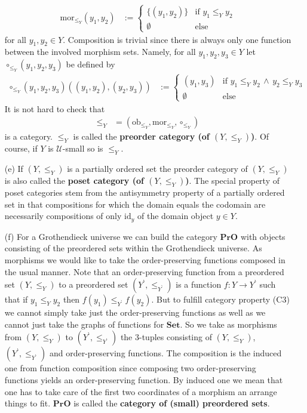\begin{exa}
\begin{enumerate}
\begin{align*}
  \mathrm{mor}_{\pmb{\leq}_{Y}}(y_{1},y_{2})
  &:=
  \begin{cases}
    \lbrace (y_{1},y_{2}) \rbrace
    &
    \text{if }
    y_{1}
    \leq_{Y}
    y_{2}
    \\
    \emptyset
    &
    \text{else}
  \end{cases}
\end{align*}
for all $y_{1},y_{2} \in Y$. Composition is trivial since there is always only one function between the involved morphism sets. Namely, for all $y_{1},y_{2},y_{3} \in Y$ let $\circ_{\pmb{\leq}_{Y}}(y_{1},y_{2},y_{3})$ be defined by
\begin{align*}
  \circ_{\pmb{\leq}_{Y}}(y_{1},y_{2},y_{3})
  \left(
    (y_{1},y_{2}),
    (y_{2},y_{3})
  \right)
  &:=
  \begin{cases}
    (y_{1},y_{3})
    &
    \text{if }
    y_{1}
    \leq_{Y}
    y_{2}
    \,
    \land
    \,
    y_{2}
    \leq_{Y}
    y_{3}
    \\
    \emptyset
    &
    \text{else}
  \end{cases}
\end{align*}
It is not hard to check that
\begin{align*}
  \pmb{\leq}_{Y}
  &=
  \left(
    \mathrm{ob}_{\pmb{\leq}_{Y}},
    \mathrm{mor}_{\pmb{\leq}_{Y}},
    \circ_{\pmb{\leq}_{Y}}
  \right)
\end{align*}
is a category. $\pmb{\leq}_{Y}$ is called the \textbf{preorder category (of $(Y,\leq_{Y})$)}. Of course, if $Y$ is $\mathcal{U}$-small so is $\pmb{\leq}_{Y}$.
\item[(e)]
If $(Y,\leq_{Y})$ is a partially ordered set the preorder category of $(Y,\leq_{Y})$ is also called the \textbf{poset category (of $(Y,\leq_{Y})$)}. The special property of poset categories stem from the antisymmetry property of a partially ordered set in that compositions for which the domain equals the codomain are necessarily compositions of only $\mathrm{id}_{y}$ of the domain object $y \in Y$.
\item[(f)]
For a Grothendieck universe we can build the category $\mathbf{PrO}$ with objects consisting of the preordered sets within the Grothendieck universe. As morphisms we would like to take the order-preserving functions composed in the usual manner. Note that an order-preserving function from a preordered set $(Y,\leq_{Y})$ to a preordered set $(Y^{\backprime},\leq_{Y^{\backprime}})$ is a function $f \colon Y \rightarrow Y^{\backprime}$ such that if $y_{1} \leq_{Y} y_{2}$ then $f(y_{1}) \leq_{Y^{\backprime}} f(y_{2})$. But to fulfill category property (C3) we cannot simply take just the order-preserving functions as well as we cannot just take the graphs of functions for $\mathbf{Set}$. So we take as morphisms from $(Y,\leq_{Y})$ to  $(Y^{\backprime},\leq_{Y^{\backprime}})$ the $3$-tuples consisting of $(Y,\leq_{Y})$, $(Y^{\backprime},\leq_{Y^{\backprime}})$ and order-preserving functions. The composition is the induced one from function composition since composing two order-preserving functions yields an order-preserving function. By induced one we mean that one has to take care of the first two coordinates of a morphism an arrange things to fit. $\mathbf{PrO}$ is called the \textbf{category of (small) preordered sets}.

\end{enumerate}
\end{exa}
